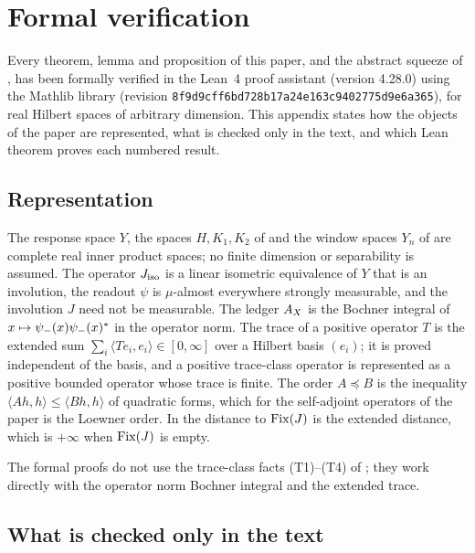 \section{Formal verification}
\label{app:formalization}

Every theorem, lemma and proposition of this paper, and the abstract
squeeze of , has been
formally verified in the Lean~4 proof assistant (version 4.28.0) using
the Mathlib library (revision
\nolinkurl{8f9d9cff6bd728b17a24e163c9402775d9e6a365}), for real Hilbert
spaces of arbitrary dimension.  This appendix states how the objects of
the paper are represented, what is checked only in the text, and which
Lean theorem proves each numbered result.

\subsection*{Representation}

The response space \(Y\), the spaces \(H,K_1,K_2\) of
 and the window
spaces \(Y_n\) of 
are complete real inner product spaces; no finite dimension or
separability is assumed.  The operator \(J_{\mathrm{iso}}\) is a linear isometric
equivalence of \(Y\) that is an involution, the readout \(\psi\) is
\(\mu\)-almost everywhere strongly measurable, and the involution \(J\)
need not be measurable.  The ledger \(A_{X}\) is the Bochner integral of
\(x\mapsto\psi_{-}(x)\psi_{-}(x)^*\) in the operator norm.  The trace of a
positive operator \(T\) is the extended sum
\(\sum_i\langle Te_i,e_i\rangle\in[0,\infty]\) over a Hilbert basis
\((e_i)\); it is proved independent of the basis, and a positive
trace-class operator is represented as a positive bounded operator whose
trace is finite.  The order \(A\preceq B\) is the inequality
\(\langle Ah,h\rangle\leq\langle Bh,h\rangle\) of quadratic forms, which
for the self-adjoint operators of the paper is the Loewner order.  In
 the distance to
\(\operatorname{Fix}(J)\) is the extended distance, which is \(+\infty\) when
\(\operatorname{Fix}(J)\) is empty.

The formal proofs do not use the trace-class facts (T1)--(T4) of
; they work directly with the operator
norm Bochner integral and the extended trace.

\subsection*{What is checked only in the text}

